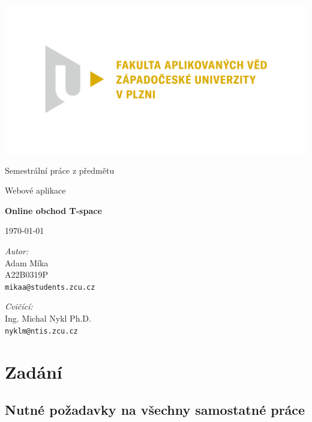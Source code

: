 \documentclass[12pt, a4paper]{report}
\newcommand{\lawyertalk}{\tiny}
\begin{document}
\begin{titlepage}
    \centering      %
    \Large          %
    \sffamily       %

    \includegraphics[width=.7\textwidth]{fav}

    Semestrální práce z předmětu

    Webové aplikace
    
    \vspace{18mm}
    {\Huge\bfseries Online obchod T-space}

    \vspace{18mm}
    \today                          %

    \vfill                          %
    \raggedright                    %
    \textsl{\lawyertalk Autor:}\\   %
    Adam Míka\\               %
    A22B0319P\\
    \texttt{mikaa@students.zcu.cz}
    
    \vspace{\baselineskip}
    \textsl{Cvičící:}\\
    Ing. Michal Nykl Ph.D.\\
    \texttt{nyklm@ntis.zcu.cz}
\end{titlepage}

\tableofcontents

\pagebreak

\section{Zadání}
\subsection{Nutné požadavky na všechny samostatné práce}
\end{document}
